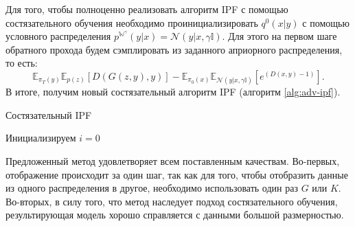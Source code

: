 Для того, чтобы полноценно реализовать алгоритм IPF с помощью состязательного обучения необходимо проинициализировать $q^0(x|y)$ с помощью условного распределения $p^{\mathbb{W}^\gamma}(y|x) = \mathcal{N}(y| x, \gamma\mathbb{I})$. Для этого на первом шаге обратного прохода будем сэмплировать из заданного априорного распределения, то есть:
\begin{equation*}
    \mathbb{E}_{\pi_T(y)}\mathbb{E}_{p(z)}[D(G(z,y),y)] - \mathbb{E}_{\pi_0(x)}\mathbb{E}_{\mathcal{N}(y| x, \gamma\mathbb{I})}\left[e^{(D(x, y) - 1)}\right].
\end{equation*}
В итоге, получим новый состязательный алгоритм IPF (алгоритм \ref{alg:adv-ipf}).

\begin{algorithm}
\caption{Состязательный IPF}\label{alg:adv-ipf}
Инициализируем $i = 0$\;
\end{algorithm}

Предложенный метод удовлетворяет всем поставленным качествам. Во-первых, отображение происходит за один шаг, так как для того, чтобы отобразить данные из одного распределения в другое, необходимо использовать один раз $G$ или $K$. Во-вторых, в силу того, что метод наследует подход состязательного обучения, результирующая модель хорошо справляется с данными большой размерностью.

\newpage
